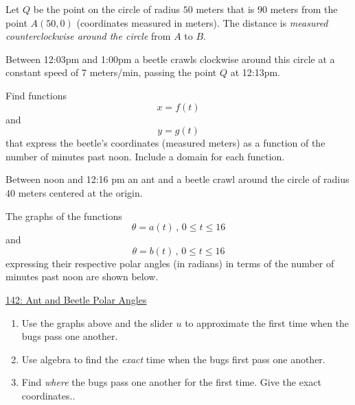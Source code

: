 \documentclass{ximera}
\begin{document}
\begin{question}  \label{Qghggnmnree}
Let $Q$ be the point on the circle of radius $50$ meters that is $90$ meters from the point $A(50,0)$  (coordinates measured in meters). The distance is \emph{measured counterclockwise around the circle} from $A$ to $B$. 

Between 12:03pm and 1:00pm a beetle crawls clockwise around this circle at a constant speed of $7$ meters/min, passing the point $Q$ at 12:13pm.

\item Find functions 
\[
    x = f(t)
\]
and 
\[
 y = g(t)
\]
that express the beetle's coordinates (measured meters) as a function of the number of minutes past noon. Include a domain for 
each function.
\end{question}


\begin{question}  \label{Q9dfdfhhhfe94tf4}

Between noon and 12:16 pm an ant and a beetle crawl around the circle of radius $40$ meters centered at the origin.  

The graphs of the functions
\[
  \theta = a(t) \, , \, 0\leq t \leq 16
\]
and
\[
   \theta = b(t) \, , \, 0\leq t \leq 16
\]
expressing their respective polar angles (in radians) in terms of the number of minutes past noon are shown below.

\begin{onlineOnly}
    \begin{center}
\end{center}
\end{onlineOnly}

\href{https://www.desmos.com/calculator/dilqmqqrt4}{142: Ant and Beetle Polar Angles}


\begin{enumerate}

\item Use the graphs above and the slider $u$ to approximate the first time when the bugs pass one another. 

\item Use algebra to find the \emph{exact} time when the bugs first pass one another.

\item Find \emph{where} the bugs pass one another for the first time. Give the exact coordinates..

\end{enumerate}

\end{question}
\end{document}
